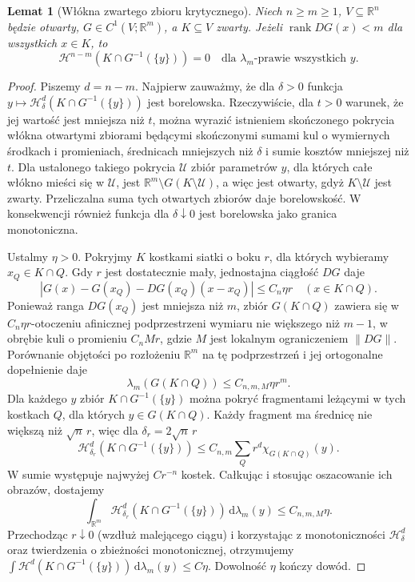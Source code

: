 \documentclass[11pt,a4paper,oneside]{book}
\numberwithin{equation}{chapter}
\theoremstyle{plain}
\newtheorem{lemat}[twierdzenie]{Lemat}
\theoremstyle{definition}
\theoremstyle{remark}
\begin{document}
\begin{lemat}[Włókna zwartego zbioru krytycznego]
\label{lem:critical-coarea-null-28}
Niech $n\ge m\ge1$, $V\subseteq\mathbb R^n$
będzie otwarty, $G\in C^1(V;\mathbb R^m)$,
a $K\subseteq V$ zwarty. Jeżeli
$\operatorname{rank}DG(x)<m$ dla wszystkich $x\in K$,
to
\[
 \mathcal H^{n-m}(K\cap G^{-1}(\{y\}))=0
 \quad\text{dla }\lambda_m\text{-prawie wszystkich }y.
\]
\end{lemat}
\begin{proof}
Piszemy $d=n-m$. Najpierw zauważmy, że dla
$\delta>0$ funkcja
$y\mapsto\mathcal H^d_\delta(K\cap G^{-1}(\{y\}))$
jest borelowska. Rzeczywiście, dla $t>0$ warunek,
że jej wartość jest mniejsza niż $t$, można
wyrazić istnieniem skończonego pokrycia włókna
otwartymi zbiorami będącymi skończonymi
sumami kul o wymiernych środkach i promieniach,
średnicach mniejszych niż $\delta$ i sumie kosztów
mniejszej niż $t$. Dla ustalonego takiego pokrycia
$\mathcal U$ zbiór parametrów $y$, dla których
całe włókno mieści się w $\mathcal U$, jest
$\mathbb R^m\setminus G(K\setminus\mathcal U)$,
a więc jest otwarty, gdyż $K\setminus\mathcal U$
jest zwarty. Przeliczalna suma tych otwartych
zbiorów daje borelowskość. W konsekwencji
również funkcja dla $\delta\downarrow0$ jest
borelowska jako granica monotoniczna.

Ustalmy $\eta>0$. Pokryjmy $K$ kostkami siatki
o boku $r$, dla których wybieramy
$x_Q\in K\cap Q$. Gdy $r$ jest dostatecznie
mały, jednostajna ciągłość $DG$ daje
\[
 |G(x)-G(x_Q)-DG(x_Q)(x-x_Q)|\le C_n\eta r
 \quad(x\in K\cap Q).
\]
Ponieważ ranga $DG(x_Q)$ jest mniejsza niż $m$,
zbiór $G(K\cap Q)$ zawiera się w
$C_n\eta r$-otoczeniu afinicznej podprzestrzeni
wymiaru nie większego niż $m-1$, w obrębie
kuli o promieniu $C_nMr$, gdzie $M$ jest
lokalnym ograniczeniem $\|DG\|$.
Porównanie objętości po rozłożeniu
$\mathbb R^m$ na tę podprzestrzeń i jej
ortogonalne dopełnienie daje
\[
 \lambda_m(G(K\cap Q))\le C_{n,m,M}\eta r^m.
\]
Dla każdego $y$ zbiór $K\cap G^{-1}(\{y\})$
można pokryć fragmentami leżącymi w tych
kostkach $Q$, dla których $y\in G(K\cap Q)$.
Każdy fragment ma średnicę nie większą niż
$\sqrt n\,r$, więc dla $\delta_r=2\sqrt n\,r$
\[
 \mathcal H^d_{\delta_r}(K\cap G^{-1}(\{y\}))
 \le C_{n,m}\sum_Q r^d\chi_{G(K\cap Q)}(y).
\]
W sumie występuje najwyżej $Cr^{-n}$ kostek.
Całkując i stosując oszacowanie ich obrazów,
dostajemy
\[
 \int_{\mathbb R^m}\mathcal H^d_{\delta_r}
 (K\cap G^{-1}(\{y\}))\,\mathrm d\lambda_m(y)
 \le C_{n,m,M}\eta.
\]
Przechodząc $r\downarrow0$ (wzdłuż malejącego
ciągu) i korzystając z monotoniczności
$\mathcal H^d_\delta$ oraz twierdzenia o
zbieżności monotonicznej, otrzymujemy
$\int\mathcal H^d(K\cap G^{-1}(\{y\}))
\,\mathrm d\lambda_m(y)\le C\eta$.
Dowolność $\eta$ kończy dowód.
\end{proof}
\end{document}
